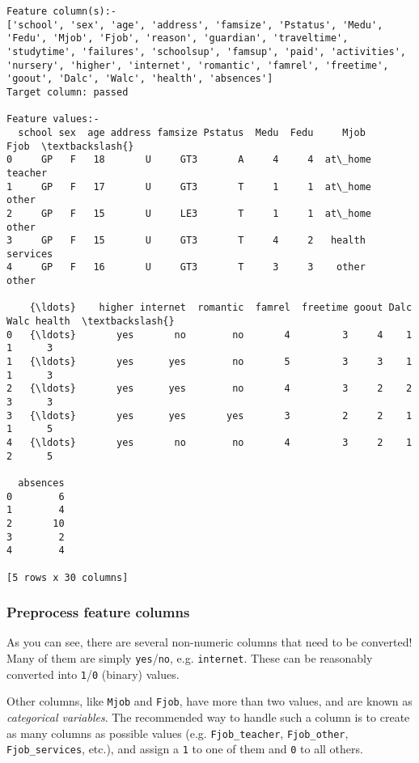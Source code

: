 \documentclass{article}
\begin{document}
    \begin{Verbatim}[commandchars=\\\{\}]
Feature column(s):-
['school', 'sex', 'age', 'address', 'famsize', 'Pstatus', 'Medu', 'Fedu', 'Mjob', 'Fjob', 'reason', 'guardian', 'traveltime', 'studytime', 'failures', 'schoolsup', 'famsup', 'paid', 'activities', 'nursery', 'higher', 'internet', 'romantic', 'famrel', 'freetime', 'goout', 'Dalc', 'Walc', 'health', 'absences']
Target column: passed

Feature values:-
  school sex  age address famsize Pstatus  Medu  Fedu     Mjob      Fjob  \textbackslash{}
0     GP   F   18       U     GT3       A     4     4  at\_home   teacher   
1     GP   F   17       U     GT3       T     1     1  at\_home     other   
2     GP   F   15       U     LE3       T     1     1  at\_home     other   
3     GP   F   15       U     GT3       T     4     2   health  services   
4     GP   F   16       U     GT3       T     3     3    other     other   

    {\ldots}    higher internet  romantic  famrel  freetime goout Dalc Walc health  \textbackslash{}
0   {\ldots}       yes       no        no       4         3     4    1    1      3   
1   {\ldots}       yes      yes        no       5         3     3    1    1      3   
2   {\ldots}       yes      yes        no       4         3     2    2    3      3   
3   {\ldots}       yes      yes       yes       3         2     2    1    1      5   
4   {\ldots}       yes       no        no       4         3     2    1    2      5   

  absences  
0        6  
1        4  
2       10  
3        2  
4        4  

[5 rows x 30 columns]
    \end{Verbatim}

    \subsubsection{Preprocess feature
columns}\label{preprocess-feature-columns}

As you can see, there are several non-numeric columns that need to be
converted! Many of them are simply \texttt{yes}/\texttt{no}, e.g.
\texttt{internet}. These can be reasonably converted into
\texttt{1}/\texttt{0} (binary) values.

Other columns, like \texttt{Mjob} and \texttt{Fjob}, have more than two
values, and are known as \emph{categorical variables}. The recommended
way to handle such a column is to create as many columns as possible
values (e.g. \texttt{Fjob\_teacher}, \texttt{Fjob\_other},
\texttt{Fjob\_services}, etc.), and assign a \texttt{1} to one of them
and \texttt{0} to all others.
\end{document}
